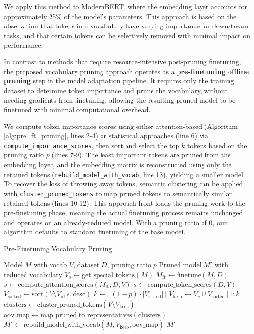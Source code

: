 \documentclass[twocolumn]{article}
\begin{document}
We apply this method to ModernBERT, where the embedding layer accounts for approximately 25\% of the model's parameters. This approach is based on the observation that tokens in a vocabulary have varying importance for downstream tasks, and that certain tokens can be selectively removed with minimal impact on performance. 

In contrast to methods that require resource-intensive post-pruning finetuning, the proposed vocabulary pruning approach operates as a \textbf{pre-finetuning offline pruning} step in the model adaptation pipeline.
It requires only the training dataset to determine token importance and prune the vocabulary, without needing gradients from finetuning, allowing the resulting pruned model to be finetuned with minimal computational overhead.


We compute token importance scores using either attention-based (Algorithm \ref{alg:pre_ft_pruning}, lines 2-4) or statistical approaches (line 6) via \texttt{compute\_importance\_scores}, then sort and select the top $k$ tokens based on the pruning ratio $p$ (lines 7-9).
The least important tokens are pruned from the embedding layer, and the embedding matrix is reconstructed using only the retained tokens (\texttt{rebuild\_model\_with\_vocab}, line 13), yielding a smaller model. 
To recover the loss of throwing away tokens, semantic clustering can be applied with \texttt{cluster\_pruned\_tokens} to map pruned tokens to semantically similar retained tokens (lines 10-12). 
This approach front-loads the pruning work to the pre-finetuning phase, meaning the actual finetuning process remains unchanged and operates on an already-reduced model. With a pruning ratio of 0, our algorithm defaults to standard finetuning of the base model.

\begin{algorithm}[H]
\footnotesize
\caption{Pre-Finetuning Vocabulary Pruning}
\label{alg:pre_ft_pruning}
\begin{algorithmic}[1]
\Require Model $M$ with vocab $V$, dataset $D$, pruning ratio $p$
\Ensure Pruned model $M'$ with reduced vocabulary
\State $V_s \gets \text{get\_special\_tokens}(M)$ \Comment{[CLS], [SEP]}
    \State $M_\text{ft} \gets \text{finetune}(M, D)$ 
    \State $s \gets \text{compute\_attention\_scores}(M_\text{ft}, D, V)$ 
\Else
    \State $s \gets \text{compute\_token\_scores}(D, V)$
\EndIf
\State $V_{\text{sorted}} \gets \text{sort}(V \setminus V_s, s, \text{desc})$
\State $k \gets \lfloor (1-p) \cdot |V_{\text{sorted}}| \rfloor$ 
\State $V_{\text{keep}} \gets V_s \cup V_{\text{sorted}}[1:k]$
    \State $\text{clusters} \gets \text{cluster\_pruned\_tokens}(V \setminus V_{\text{keep}})$
    \State $\text{oov\_map} \gets \text{map\_pruned\_to\_representatives}(\text{clusters})$
\EndIf
\State $M' \gets \text{rebuild\_model\_with\_vocab}(M, V_{\text{keep}}, \text{oov\_map})$
\State \Return $M'$
\end{algorithmic}
\end{algorithm}
\end{document}
